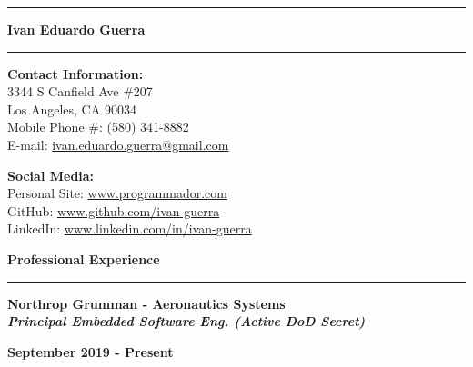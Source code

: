 \documentclass[10pt,letterpaper]{article}
\begin{document}

\hrule
\begin{center}
    \begin{LARGE}
        \textbf{Ivan Eduardo Guerra}
    \end{LARGE}
\end{center}
\hrule

\medskip

\begin{minipage}[t]{0.53\textwidth}
    \begin{flushleft}
        \textbf{Contact Information:}\\
        3344 S Canfield Ave \#207\\
        Los Angeles, CA 90034\\
        Mobile Phone \#: (580) 341-8882\\
        E-mail:
            \href{mailto:ivan.eduardo.guerra@gmail.com}{ivan.eduardo.guerra@gmail.com}
    \end{flushleft}
\end{minipage}
\begin{minipage}[t]{0.44\textwidth}
    \begin{flushright}
        \begin{flushleft}
            \textbf{Social Media:}\\
            Personal Site: \url{www.programmador.com}\\
            GitHub: \url{www.github.com/ivan-guerra}\\
            LinkedIn: \url{www.linkedin.com/in/ivan-guerra}
        \end{flushleft}
    \end{flushright}
\end{minipage}

\medskip

\begin{large}
    \textbf{Professional Experience}
\end{large}

\smallskip \hrule \smallskip

\begin{minipage}[t]{0.53\textwidth}
    \begin{flushleft}
        \textbf{Northrop Grumman - Aeronautics Systems}\\
        \textbf{\textit{Principal Embedded Software Eng. (Active DoD Secret)}}\\
    \end{flushleft}
\end{minipage}
\begin{minipage}[t]{0.44\textwidth}
    \begin{flushright}
        \textbf{September 2019 - Present}
    \end{flushright}
\end{minipage}
\end{document}

